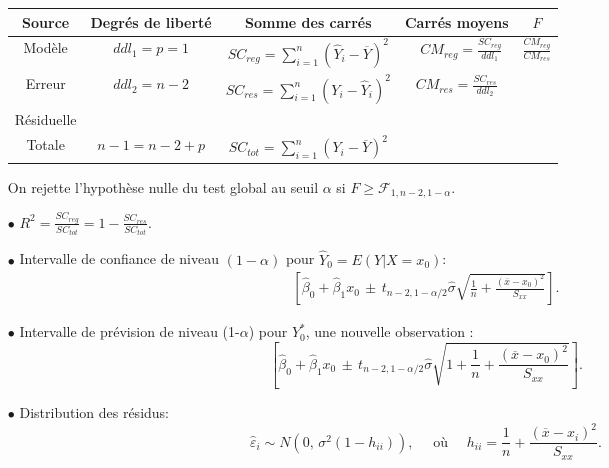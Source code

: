 \documentclass[a4paper, 11pt]{article}
\begin{document}
\begin{itemize}
\begin{table}[htb!]
\renewcommand{\arraystretch}{1.6}
\begin{tabular}{|c|c|c|c|c|}\hline
Source & Degrés de liberté & Somme des carrés & Carrés moyens & $F$ \\ \hline
Modèle & $ddl_1=p=1$ & $\displaystyle SC_{reg}=\sum_{i=1}^n (\widehat Y_i - \overline Y)^2$ & $\textbf{ }CM_{reg}=\frac{\displaystyle SC_{reg}}{\displaystyle ddl_1}$  & $ \frac{\displaystyle CM_{reg}}{\displaystyle CM_{res}}$ \\ \hline
Erreur & $ddl_2=n-2$ & $\displaystyle SC_{res}=\sum_{i=1}^n (Y_i - \widehat Y_i)^2$ & $ CM_{res}=\frac{\displaystyle SC_{res}}{\displaystyle ddl_2}$ & \vspace*{-3 mm}\\
Résiduelle & & & & \\ \hline
Totale & $n-1=n-2+p$ & $\displaystyle SC_{tot}=\sum_{i=1}^n (Y_i - \overline Y)^2$ &  & \\ \hline
\end{tabular}
\end{table}


On rejette l'hypothèse nulle du test global au seuil $\alpha$ si $F\geq \mathcal{F}_{1, n-2,1-\alpha}$.\\

\item[$\bullet$] $\displaystyle R^2 =\frac{SC_{reg}} {SC_{tot}} =  1 - \frac{SC_{res}}{SC_{tot}}.$

\item[$\bullet$] Intervalle de confiance de niveau $(1-\alpha)$ pour $\widehat Y_{0} = E(Y | X = x_0)$:
\begin{eqnarray*}
\left[\widehat{\beta}_0 + \widehat{\beta}_1 x_0 \, \pm \, t_{n-2,1-\alpha/2} \widehat{\sigma} \sqrt{\frac{1}{n}+\frac{(\overline x-x_0)^2}{S_{xx}}}\right].
\end{eqnarray*}

\item[$\bullet$] 
Intervalle de prévision de niveau (1-$\alpha$) pour $Y_0^*$, une nouvelle observation :
$$\left[\widehat{\beta}_0 + \widehat{\beta}_1 x_0 \, \pm \, t_{n-2, 1-\alpha/2} \widehat{\sigma} \sqrt{1+\frac{1}{n}+\frac{(\overline x-x_0)^2}{S_{xx}}} \right].$$

\item[$\bullet$] Distribution des résidus: $$ \widehat\varepsilon_i \sim N(0, \, \sigma^2(1-h_{ii})), \quad \mbox{ où } \quad  h_{ii} = \frac{1}{n} + \frac{(\overline{x}-x_i)^2}{S_{xx}}.$$


\end{itemize}
\end{document}
